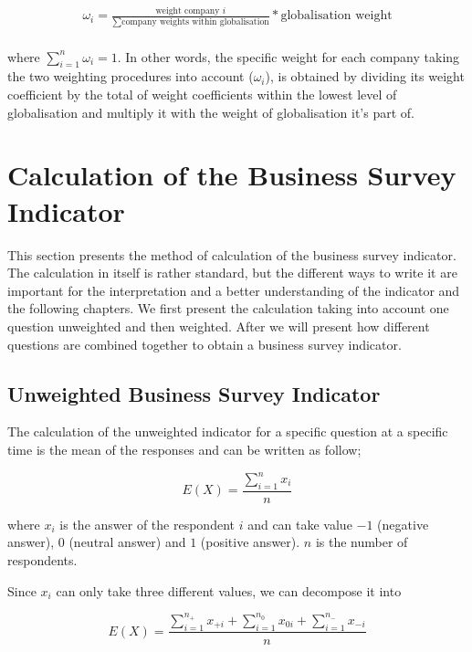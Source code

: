 \documentclass[12pt,a4paper,oneside]{book}
\begin{document}
\begin{eqnarray}
    \omega_i = \frac{ \text{weight company $i$} }{ \sum\text{company weights within globalisation} } * \text{globalisation weight} \\ \nonumber
\end{eqnarray}

where $\sum_{i=1}^{n} \omega_i = 1 $. In other words, the specific weight for each company taking the two weighting procedures into account ($\omega_i$), is obtained by dividing its weight coefficient by the total of weight coefficients within the lowest level of globalisation and multiply it with the weight of globalisation it's part of. 


\section{Calculation of the Business Survey Indicator}

This section presents the method of calculation of the business survey indicator.
The calculation in itself is rather standard, but the different ways to write it are important for the interpretation and a better understanding of the indicator and the following chapters.
We first present the calculation taking into account one question unweighted and then weighted. 
After we will present how different questions are combined together to obtain a business survey indicator.


\subsection{Unweighted Business Survey Indicator}

The calculation of the unweighted indicator for a specific question at a specific time is the mean of the responses and can be written as follow;

\begin{equation}
    E(X) = \frac{ \sum_{i=1}^n x_i}{n}
\end{equation} 

where 
$x_i$ is the answer of the respondent $i$ and can take value $-1$ (negative answer), $0$ (neutral answer) and $1$ (positive answer). 
$n$ is the number of respondents.

Since $x_i$ can only take three different values, we can decompose it into 

\begin{equation}
    E(X) = \frac{ \sum_{i=1}^{n_+} x_{+i} + \sum_{i=1}^{n_0} x_{0i} + \sum_{i=1}^{n_-} x_{-i}}{n}
\end{equation} 
\end{document}
